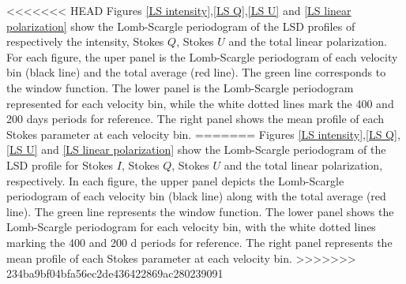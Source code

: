 \documentclass{aa}
\begin{document}

<<<<<<< HEAD
Figures \ref{LS intensity},\ref{LS Q},\ref{LS U} and \ref{LS linear polarization} show the Lomb-Scargle periodogram of the LSD profiles of respectively 
the intensity, Stokes $Q$, Stokes $U$ and the total linear polarization. 
For each figure, the uper panel is the Lomb-Scargle periodogram of each velocity bin (black line) and the total average (red line). The green line corresponds to the window function. 
The lower panel is the Lomb-Scargle periodogram represented for each velocity bin, while the white dotted lines mark the 400 and 200 days periods for 
reference. The right panel shows the mean profile of each Stokes parameter at each velocity bin.
=======
Figures \ref{LS intensity},\ref{LS Q},\ref{LS U} and \ref{LS linear polarization} show the Lomb-Scargle periodogram of the LSD profile for Stokes $I$, Stokes $Q$, Stokes $U$ and the total linear polarization, respectively. 
In each figure, the upper panel depicts the Lomb-Scargle periodogram of each velocity bin (black line) along with the total average (red line). The green line represents the window function. The lower panel shows the Lomb-Scargle periodogram for each velocity bin, with the white dotted lines marking the 400 and 200 d periods for reference. The right panel represents the mean profile of each Stokes parameter at each velocity bin.
>>>>>>> 234ba9bf04bfa56ec2de436422869ac280239091
\end{document}
